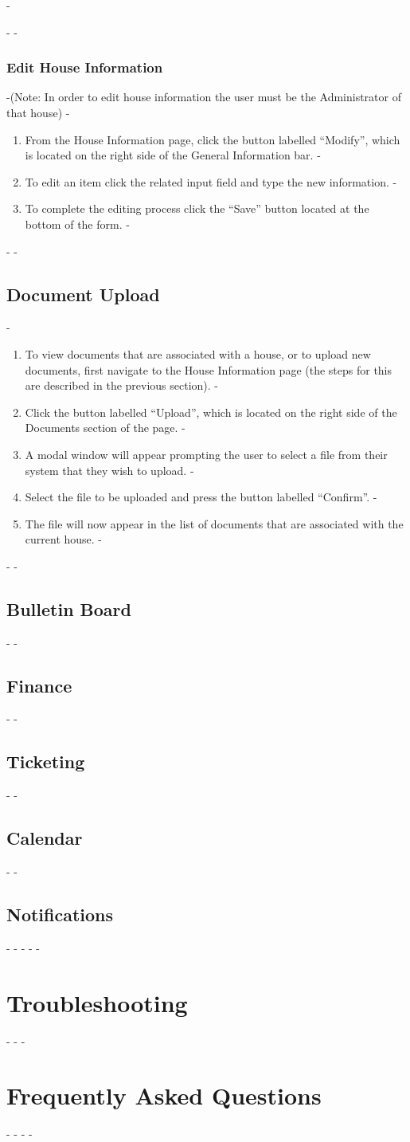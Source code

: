-\documentclass[12pt]{article}
\begin{document}
 -
 -\subsubsection{Edit House Information}
 -(Note: In order to edit house information the user must be the Administrator of that house)
 -\begin{enumerate}
 -\item From the House Information page, click the button labelled ``Modify'', which is located on the right side of the General Information bar.
 -\item To edit an item click the related input field and type the new information.
 -\item To complete the editing process click the ``Save'' button located at the bottom of the form.
 -\end{enumerate}
 -
 -\subsection{Document Upload} %
 -\begin{enumerate}
 -\item To view documents that are associated with a house, or to upload new documents, first navigate to the House Information page (the steps for this are described in the previous section).
 -\item Click the button labelled ``Upload'', which is located on the right side of the Documents section of the page.
 -\item A modal window will appear prompting the user to select a file from their system that they wish to upload.
 -\item Select the file to be uploaded and press the button labelled ``Confirm''.
 -\item The file will now appear in the list of documents that are associated with the current house.
 -\end{enumerate}
 -
 -\subsection{Bulletin Board}
 -
 -\subsection{Finance}
 -
 -\subsection{Ticketing}
 -
 -\subsection{Calendar}
 -
 -\subsection{Notifications}
 -
 -
 -
 -%
 -\section{Troubleshooting}
 -
 -%
 -\section{Frequently Asked Questions}
 -
 -%
 -
 -
\end{document}
